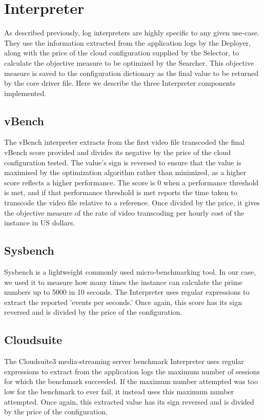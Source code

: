 \documentclass{report}
\begin{document}
\section{Interpreter}
As described previously, log interpreters are highly specific to any given use-case. They use the information extracted from the application logs by the Deployer, along with the price of the cloud configuration supplied by the Selector, to calculate the objective measure to be optimized by the Searcher. This objective measure is saved to the configuration dictionary as the final value to be returned by the core driver file. Here we describe the three Interpreter components implemented.
\subsection{vBench}
The vBench interpreter extracts from the first video file transcoded the final vBench score provided and divides its negative by the price of the cloud configuration tested. The value's sign is reversed to ensure that the value is maximised by the optimization algorithm rather than minimized, as a higher score reflects a higher performance. The score is 0 when a performance threshold is met, and if that performance threshold is met reports the time taken to transcode the video file relative to a reference. Once divided by the price, it gives the objective measure of the rate of video transcoding per hourly cost of the instance in US dollars. 
\subsection{Sysbench}
Sysbench is a lightweight commonly used micro-benchmarking tool. In our case, we used it to measure how many times the instance can calculate the prime numbers up to 5000 in 10 seconds. The Interpreter uses regular expressions to extract the reported 'events per seconds.' Once again, this score has its sign reversed and is divided by the price of the configuration.
\subsection{Cloudsuite}
The Cloudsuite3 media-streaming server benchmark Interpreter uses regular expressions to extract from the application logs the maximum number of sessions for which the benchmark succeeded. If the maximum number attempted was too low for the benchmark to ever fail, it instead uses this maximum number attempted. Once again, this extracted value has its sign reversed and is divided by the price of the configuration.
\end{document}
